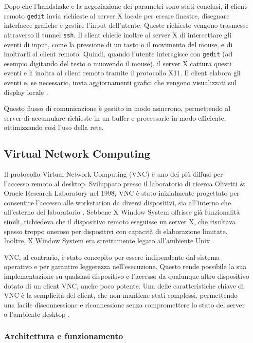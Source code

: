 \documentclass[12pt,a4paper,openright,twoside]{book}
\begin{document}
Dopo che l'handshake e la negoziazione dei parametri sono stati conclusi, il client remoto \texttt{gedit} invia richieste al server X locale per creare finestre, disegnare interfacce grafiche e gestire l'input dell'utente. Queste richieste vengono trasmesse attraverso il tunnel \texttt{ssh}. Il client chiede inoltre al server X di intercettare gli eventi di input, come la pressione di un tasto o il movimento del mouse, e di inoltrarli al client remoto. Quindi, quando l'utente interagisce con \texttt{gedit} (ad esempio digitando del testo o muovendo il mouse), il server X cattura questi eventi e li inoltra al client remoto tramite il protocollo X11. Il client elabora gli eventi e, se necessario, invia aggiornamenti grafici che vengono visualizzati sul display locale \cite{xDevGuide}.

Questo flusso di comunicazione è gestito in modo asincrono, permettendo al server di accumulare richieste in un buffer e processarle in modo efficiente, ottimizzando così l'uso della rete.

\subsection{Virtual Network Computing}

Il protocollo Virtual Network Computing (VNC) è uno dei più diffusi per l'accesso remoto al desktop. Sviluppato presso il laboratorio di ricerca Olivetti \& Oracle Research Laboratory nel 1998, VNC è stato inizialmente progettato per consentire l'accesso alle workstation da diversi dispositivi, sia all'interno che all'esterno del laboratorio \cite{richardson1998vnc}. Sebbene X Window System offrisse già funzionalità simili, richiedeva che il dispositivo remoto eseguisse un server X, che risultava spesso troppo oneroso per dispositivi con capacità di elaborazione limitate. Inoltre, X Window System era strettamente legato all'ambiente Unix \cite{richardson1998vnc}.

VNC, al contrario, è stato concepito per essere indipendente dal sistema operativo e per garantire leggerezza nell'esecuzione. Questo rende possibile la sua implementazione su qualsiasi dispositivo e l'accesso da qualunque altro dispositivo dotato di un client VNC, anche poco potente. Una delle caratteristiche chiave di VNC è la semplicità del client, che non mantiene stati complessi, permettendo una facile disconnessione e riconnessione senza compromettere lo stato del server o l'ambiente desktop \cite{richardson1998vnc}.

\subsubsection{Architettura e funzionamento}
\end{document}
